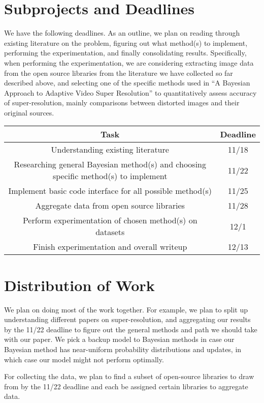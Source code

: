 \documentclass[10pt]{paper}
\numberwithin{equation}{section} %
\numberwithin{figure}{section} %
\numberwithin{table}{section} %
\begin{document}
\section{Subprojects and Deadlines}

We have the following deadlines. As an outline, we plan on reading through existing literature on the problem, figuring out what method(s) to implement, performing the experimentation, and finally consolidating results. Specifically, when performing the experimentation, we are considering extracting image data from the open source libraries from the literature we have collected so far described above, and selecting one of the specific methods used in ``A Bayesian Approach to Adaptive Video Super Resolution'' to quantitatively assess accuracy of super-resolution, mainly comparisons between distorted images and their original sources.

\begin{center}
\begin{tabular}{c|c}
Task & Deadline  \\ \hline
Understanding existing literature & 11/18 \\
Researching general Bayesian method(s) and choosing specific method(s) to implement & 11/22 \\
Implement basic code interface for all possible method(s) & 11/25 \\
Aggregate data from open source libraries & 11/28 \\
Perform experimentation of chosen method(s) on datasets & 12/1 \\
Finish experimentation and overall writeup & 12/13 \\
\end{tabular}
\end{center}

\section{Distribution of Work}

We plan on doing most of the work together. For example, we plan to split up understanding different papers on super-resolution, and aggregating our results by the 11/22 deadline to figure out the general methods and path we should take with our paper. We pick a backup model to Bayesian methods in case our Bayesian method has near-uniform probability distributions and updates, in which case our model might not perform optimally.

For collecting the data, we plan to find a subset of open-source libraries to draw from by the 11/22 deadline and each be assigned certain libraries to aggregate data.
\end{document}
